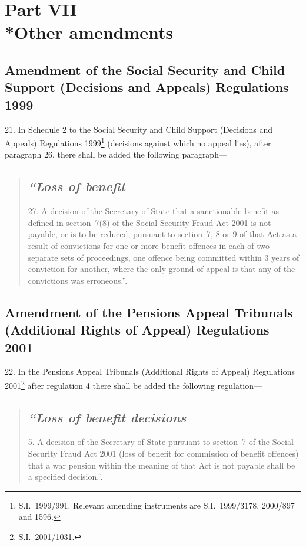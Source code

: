 \documentclass[12pt,a4paper]{article}
\begin{document}
\vfill\eject

\section[Part VII --- Other amendments]{Part VII\\*Other amendments}

\renewcommand\parthead{--- Part VII}

\subsection[21. Amendment of the Social Security and Child Support (Decisions and Appeals) Regulations 1999]{Amendment of the Social Security and Child Support (Decisions and Appeals) Regulations 1999}

21.  In Schedule 2 to the Social Security and Child Support (Decisions and Appeals) Regulations 1999\footnote{S.I.~1999/991. Relevant amending instruments are S.I.~1999/3178, 2000/897 and 1596.} (decisions against which no appeal lies), after paragraph 26, there shall be added the following paragraph—
\begin{quotation}
\subsection*{\itshape “Loss of benefit}

27.  A decision of the Secretary of State that a sanctionable benefit as defined in section~7(8) of the Social Security Fraud Act 2001 is not payable, or is to be reduced, pursuant to section~7, 8 or 9 of that Act as a result of convictions for one or more benefit offences in each of two separate sets of proceedings, one offence being committed within 3 years of conviction for another, where the only ground of appeal is that any of the convictions was erroneous.”.
\end{quotation}

\subsection[22. Amendment of the Pensions Appeal Tribunals (Additional Rights of Appeal) Regulations 2001]{Amendment of the Pensions Appeal Tribunals (Additional Rights of Appeal) Regulations 2001}

22.  In the Pensions Appeal Tribunals (Additional Rights of Appeal) Regulations 2001\footnote{S.I.~2001/1031.} after regulation 4 there shall be added the following regulation—
\begin{quotation}
\subsection*{\itshape “Loss of benefit decisions}

5.  A decision of the Secretary of State pursuant to section~7 of the Social Security Fraud Act 2001 (loss of benefit for commission of benefit offences) that a war pension within the meaning of that Act is not payable shall be a specified decision.”.
\end{quotation}
\end{document}
